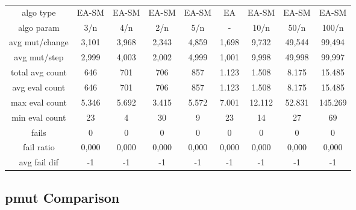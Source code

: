 \begin{tabular}[h]{ccccccccc}
algo type&          EA-SM&   EA-SM&   EA-SM&   EA-SM&      EA&   EA-SM&   EA-SM&   EA-SM\\
algo param&           3/n&     4/n&     2/n&     5/n&       -&    10/n&    50/n&   100/n\\
avg mut/change&     3,101&   3,968&   2,343&   4,859&   1,698&   9,732&  49,544&  99,494\\
avg mut/step&       2,999&   4,003&   2,002&   4,999&   1,001&   9,998&  49,998&  99,997\\
\hline
total avg count&      646&     701&     706&     857&   1.123&   1.508&   8.175&  15.485\\
avg eval count&       646&     701&     706&     857&   1.123&   1.508&   8.175&  15.485\\
max eval count&     5.346&   5.692&   3.415&   5.572&   7.001&  12.112&  52.831& 145.269\\
min eval count&        23&       4&      30&       9&      23&      14&      27&      69\\
\hline
fails&                  0&       0&       0&       0&       0&       0&       0&       0\\
fail ratio&         0,000&   0,000&   0,000&   0,000&   0,000&   0,000&   0,000&   0,000\\
avg fail dif&          -1&      -1&      -1&      -1&      -1&      -1&      -1&      -1\\
\end{tabular}


\subsection{pmut Comparison}


